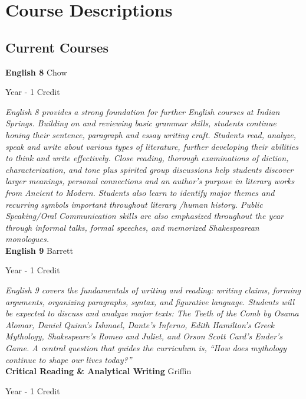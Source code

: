 \section{Course Descriptions}

\subsection{Current Courses}
\noindent\textbf{English 8} \hfill Chow

\noindent Year - 1 Credit

\vspace{1mm}\emph{English 8 provides a strong foundation for further English courses at Indian Springs. Building on and reviewing basic grammar skills, students continue honing their sentence, paragraph and essay writing craft. Students read, analyze, speak and write about various types of literature, further developing their abilities to think and write effectively. Close reading, thorough examinations of diction, characterization, and tone plus spirited group discussions help students discover larger meanings, personal connections and an author's purpose in literary works from Ancient to Modern. Students also learn to identify major themes and recurring symbols important throughout literary /human history. Public Speaking/Oral Communication skills are also emphasized throughout the year through informal talks, formal speeches, and memorized Shakespearean monologues.}\\

\noindent\textbf{English 9} \hfill Barrett

\noindent Year - 1 Credit

\vspace{1mm}\emph{English 9 covers the fundamentals of writing and reading: writing claims, forming arguments, organizing paragraphs, syntax, and figurative language. Students will be expected to discuss and analyze major texts: The Teeth of the Comb by Osama Alomar, Daniel Quinn's Ishmael, Dante's Inferno, Edith Hamilton's Greek Mythology, Shakespeare's Romeo and Juliet, and Orson Scott Card's Ender's Game.  A central question that guides the curriculum is, ``How does mythology continue to shape our lives today?''}\\

\noindent\textbf{Critical Reading \& Analytical Writing} \hfill Griffin

\noindent Year - 1 Credit

